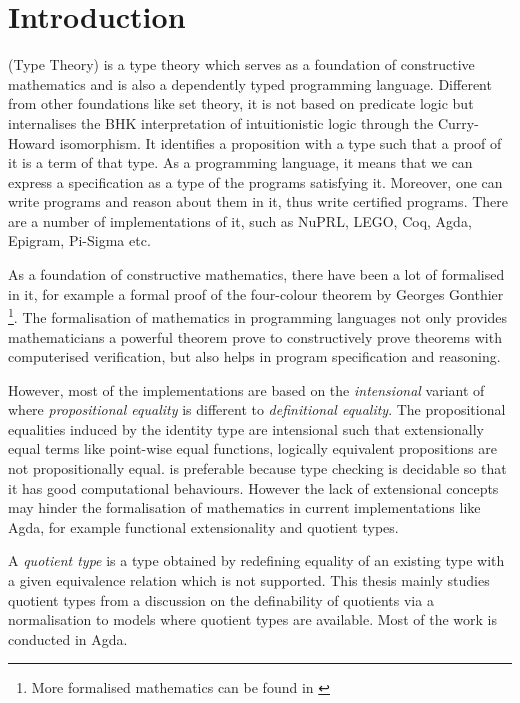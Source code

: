 \chapter{Introduction}

\mltt (Type Theory) is a type theory which serves as a foundation of constructive mathematics and is also a dependently typed programming language. Different from other foundations like set theory, it is not based on predicate logic but internalises the BHK interpretation of intuitionistic logic through the Curry-Howard isomorphism. It identifies a proposition with a type such that a proof of it is a term of that type. 
As a programming language, it means that we can express a specification as a type of the programs satisfying it.
Moreover, one can write programs and reason about them in it, thus write certified programs. There are a number of implementations of it, such as NuPRL, LEGO, Coq, Agda, Epigram, Pi-Sigma etc.


As a foundation of constructive mathematics, there have been a lot of \maths formalised in it, for example a formal proof of the four-colour theorem by Georges Gonthier \cite{gonthier08ams} \footnote{More formalised mathematics can be found in \cite{sbfm}}. The formalisation of mathematics in programming languages not only provides mathematicians a powerful theorem prove to constructively prove theorems with computerised verification, but also helps in program specification and reasoning. 




However, most of the implementations are based on the \emph{intensional} variant of \mltt where \emph{propositional equality} is different to \emph{definitional equality}. The propositional equalities induced by the identity type are intensional such that extensionally equal terms like point-wise equal functions, logically equivalent propositions are not propositionally equal. \itt is preferable because type checking is decidable so that it has good computational behaviours. However the lack of extensional concepts may hinder the formalisation of mathematics in current implementations like Agda, for example functional extensionality and quotient types.







A \emph{quotient type} is a type obtained by redefining equality of an existing type with a given equivalence relation which is not supported. This thesis mainly studies quotient types from a discussion on the definability of quotients via a normalisation to models where quotient types are available. Most of the work is conducted in Agda.







